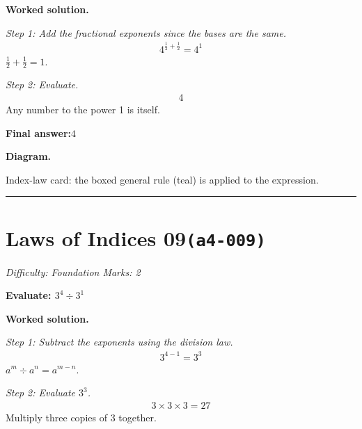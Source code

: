 \documentclass[11pt]{article}
\newcommand{\question}[1]{\par\medskip\noindent\textbf{#1}\par}
\begin{document}
\textbf{Worked solution.}

\textit{Step 1: Add the fractional exponents since the bases are the same.}
\[\begin{gathered}
4^{\frac{1}{2}+\frac{1}{2}} = 4^{1}
\end{gathered}\]
\( \frac{1}{2} + \frac{1}{2} = 1 \).

\textit{Step 2: Evaluate.}
\[\begin{gathered}
4
\end{gathered}\]
Any number to the power 1 is itself.

\begin{answerbox}
\textbf{Final answer:}\quad \(\displaystyle 4\)
\end{answerbox}
\textbf{Diagram.}

\begin{center}
\end{center}
\small Index-law card: the boxed general rule (teal) is applied to the expression.\normalsize

\medskip\hrule

\section*{Laws of Indices 09\quad\small\texttt{(a4-009)}}
\textit{Difficulty: Foundation \quad\textbar\quad Marks: 2}

\question{Evaluate: \( 3^4 \div 3^1 \)}

\textbf{Worked solution.}

\textit{Step 1: Subtract the exponents using the division law.}
\[\begin{gathered}
3^{4-1} = 3^{3}
\end{gathered}\]
\( a^m \div a^n = a^{m-n} \).

\textit{Step 2: Evaluate \( 3^3 \).}
\[\begin{gathered}
3 \times 3 \times 3 = 27
\end{gathered}\]
Multiply three copies of 3 together.
\end{document}
